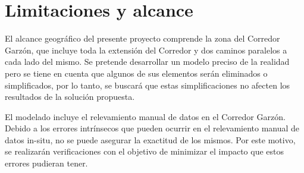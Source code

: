 %
%
%

\section{Limitaciones y alcance}

El alcance geográfico del presente proyecto comprende la zona del Corredor Garzón, que incluye toda la extensión del Corredor y dos caminos paralelos a cada lado del mismo. Se pretende desarrollar un modelo preciso de la realidad pero se tiene en cuenta que algunos de sus elementos serán eliminados o simplificados, por lo tanto, se buscará que estas simplificaciones no afecten los resultados de la solución propuesta. 

El modelado incluye el relevamiento manual de datos en el Corredor Garzón. Debido a los errores intrínsecos que pueden ocurrir en el relevamiento manual de datos in-situ, no se puede asegurar la exactitud de los mismos. Por este motivo, se realizarán verificaciones con el objetivo de minimizar el impacto que estos errores pudieran tener.

